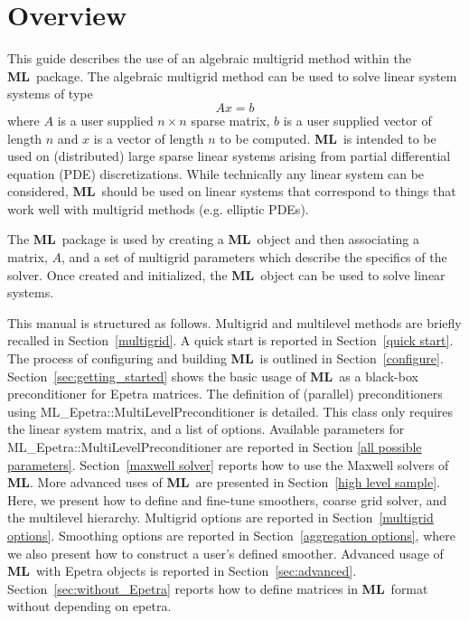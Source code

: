 \documentclass{article}[11pt]
\newcommand{\ML}     {{\bf ML}}
\begin{document}
%
\section{Overview} \label{overview}
%
This guide describes the use of an algebraic multigrid method within the
\ML\ package. The algebraic multigrid method can be used to solve linear
system systems of type
\begin{equation}
\label{eq:lin_sys}
A x = b
\end{equation}
where $A$ is a user supplied $n \times n$ sparse matrix, $b$ is a
user supplied vector of length $n$ and $x$ is a vector of length $n$ to
be computed. \ML\ is intended to be used on (distributed) large sparse
linear systems arising from partial differential equation (PDE)
discretizations.  While technically any linear system can be considered,
\ML\ should be used on linear systems that correspond to things that work
well with multigrid methods (e.g. elliptic PDEs).

The \ML\ package is used by creating a \ML\ object and then associating a
matrix, $A$, and a set of multigrid parameters which describe the
specifics of the solver. Once created and initialized, the \ML\ object
can be used to solve linear systems. 

\medskip

This manual is structured as follows.  Multigrid and multilevel methods
are briefly recalled in Section~\ref{multigrid}.  
A quick start is reported in Section~\ref{quick start}.
The process of
configuring and building \ML\ is outlined in Section~\ref{configure}.
Section~\ref{sec:getting_started} shows the basic usage of \ML\ as a
black-box preconditioner for {\sc Epetra} matrices. The definition of
(parallel) preconditioners using ML\_Epetra::MultiLevelPreconditioner is
detailed. This class only requires the linear system matrix, and a list
of options.  Available parameters for
ML\_Epetra::MultiLevelPreconditioner are reported in Section
\ref{all possible parameters}.  
Section~\ref{maxwell solver} reports how to use the Maxwell solvers of \ML.
More advanced uses of \ML\ are presented in
Section~\ref{high level sample}. Here, we present how to define and
fine-tune smoothers, coarse grid solver, and the multilevel hierarchy.
Multigrid options are reported in Section~\ref{multigrid options}.
Smoothing options are reported in Section~\ref{aggregation options},
where we also present how to construct a user's defined smoother.
Advanced usage of \ML\ with {\sc Epetra} objects is reported in
Section~\ref{sec:advanced}.  Section~\ref{sec:without_Epetra} reports
how to define matrices in \ML\ format without depending on {\sc epetra}.
\end{document}
